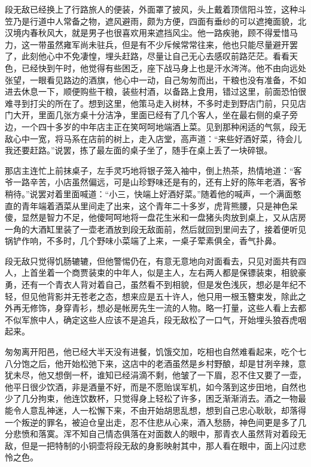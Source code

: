 段无敌已经换上了行路旅人的便装，外面罩了披风，头上戴着顶信阳斗笠，这种斗笠乃是行道中人常备之物，遮风避雨，颇为方便，四面有垂纱的可以遮掩面貌，北汉境内春秋风大，就是男子也很喜欢用来遮挡风尘。他一路疾驰，顾不得爱惜马力，这一带虽然雍军尚未驻兵，但是有不少斥候常常往来，他也只能尽量避开罢了，此刻他心中不免凄惶，埋头赶路，尽量让自己无心去感叹前路茫茫。看看天色，已经快到午时，他觉得有些困乏，座下战马身上也是汗水涔涔。他不由向远处张望，一眼看见路边的酒旗，他心中一动，自己匆匆而出，干粮也没有准备，不如进去休息一下，顺便购些干粮，装些村酒，以备路上食用，错过这里，前面恐怕很难寻到打尖的所在了。想到这里，他策马走入树林，不多时走到野店门前，只见店门大开，里面几张方桌十分洁净，里面已经有了几个客人，坐在最右侧的桌子旁边，一个四十多岁的中年店主正在笑呵呵地端酒上菜。见到那种闲适的气氛，段无敌心中一宽，将马系在店前的树上，走入店堂，高声道：“来些好酒好菜，待会儿我还要赶路。”说罢，拣了最左面的桌子坐了，随手在桌上丢了一块碎银。

那店主连忙上前抹桌子，左手灵巧地将银子笼入袖中，倒上热茶，热情地道：“客爷一路辛苦，小店虽然偏远，可是山珍野味还是有的，还有上好的陈年老酒，客爷稍待。”说罢对着里面喊道：“小三，快端上好酒好菜。”随着他的喊声，一个满面憨直的青年端着酒菜从里间走了出来，这个青年二十多岁，虎背熊腰，只是神色呆傻，显然是智力不足，他傻呵呵地将一盘花生米和一盘猪头肉放到桌上，又从店房一角的大酒缸里装了一壶老酒放到段无敌面前，然后就回到里间去了，接着便听见锅铲作响，不多时，几个野味小菜端了上来，一桌子荤素俱全，香气扑鼻。

段无敌只觉得饥肠辘辘，但他警惕仍在，有意无意地向对面看去，只见对面共有四人，上首坐着一个商贾装束的中年人，似是主人，左右两人都是保镖装束，相貌豪勇，还有一个青衣人背对着自己，虽然看不到相貌，但是发色浅灰，想必是年纪不轻，但见他背影并无苍老之态，想来应是五十许人，他只用一根玉簪束发，除此之外再无修饰，身穿青衫，想必是帐房先生一流的人物。略一打量，这些人看上去都不似军旅中人，确定这些人应该不是追兵，段无敌松了一口气，开始埋头狼吞虎咽起来。

匆匆离开阳邑，他已经大半天没有进餐，饥饿交加，吃相也自然难看起来，吃个七八分饱之后，他开始松弛下来，这店中的老酒虽然是乡村野酿，却是甘冽辛辣，意犹未尽，他又想倒一杯，谁知已经涓滴不剩，他皱了一下眉，忍不住又要了一壶，他平日很少饮酒，非是酒量不好，而是不愿贻误军机，如今落到这步田地，自然也少了几分拘束，他连饮数杯，只觉得身上轻松了许多，困乏渐渐消去。酒之一物最能令人意乱神迷，人一松懈下来，不由开始胡思乱想，想到自己忠心耿耿，却落得一个叛逆的罪名，被迫仓皇出走，忍不住悲从心来，酒入愁肠，神色间更是多了几分悲愤和落寞。浑不知自己情态俱落在对面数人的眼中，那青衣人虽然背对着段无敌，但是一把特制的小铜壶将段无敌的身影映射其中，那人看在眼中，面上闪过悲怜之色。

